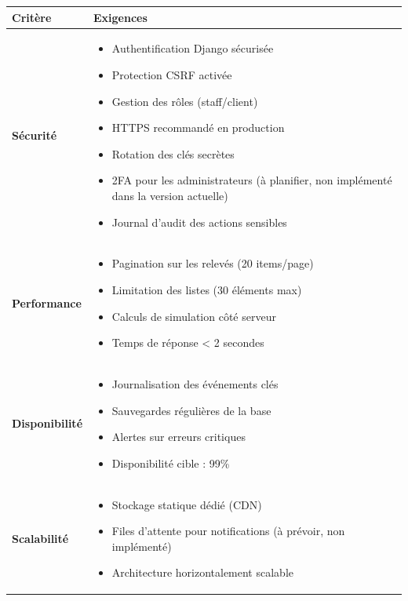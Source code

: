 \documentclass[12pt,a4paper]{report}
\begin{document}
\begin{table}[H]
\centering
\begin{tabular}{|p{4cm}|p{10cm}|}
\hline
\rowcolor{banquiseblue!30}
\textbf{Critère} & \textbf{Exigences} \\
\hline
\textbf{Sécurité} & 
\begin{itemize}[leftmargin=0.5cm]
    \item Authentification Django sécurisée
    \item Protection CSRF activée
    \item Gestion des rôles (staff/client)
    \item HTTPS recommandé en production
    \item Rotation des clés secrètes
    \item 2FA pour les administrateurs (à planifier, non implémenté dans la version actuelle)
    \item Journal d'audit des actions sensibles
\end{itemize} \\
\hline
\textbf{Performance} & 
\begin{itemize}[leftmargin=0.5cm]
    \item Pagination sur les relevés (20 items/page)
    \item Limitation des listes (30 éléments max)
    \item Calculs de simulation côté serveur
    \item Temps de réponse < 2 secondes
\end{itemize} \\
\hline
\textbf{Disponibilité} & 
\begin{itemize}[leftmargin=0.5cm]
    \item Journalisation des événements clés
    \item Sauvegardes régulières de la base
    \item Alertes sur erreurs critiques
    \item Disponibilité cible : 99\%
\end{itemize} \\
\hline
\textbf{Scalabilité} & 
\begin{itemize}[leftmargin=0.5cm]
    \item Stockage statique dédié (CDN)
    \item Files d'attente pour notifications (à prévoir, non implémenté)
    \item Architecture horizontalement scalable
\end{itemize} \\

\end{tabular}
\end{table}
\end{document}
